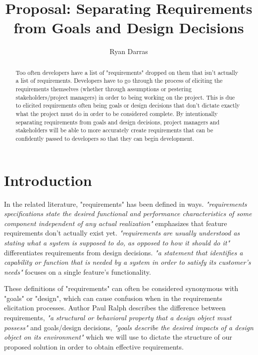 \documentclass[format=acmlarge]{acmart}
\title{Proposal: Separating Requirements from Goals and Design Decisions}
\author{Ryan Darras}
\begin{document}
\begin{abstract}
Too often developers have a list of "requirements" dropped on them that isn't actually a list of requirements. Developers have to go through the process of eliciting the requirements themselves (whether through assumptions or pestering stakeholders/project managers) in order to being working on the project. This is due to elicited requirements often being goals or design decisions that don't dictate exactly what the project must do in order to be considered complete. By intentionally separating requirements from goals and design decisions, project managers and stakeholders will be able to more accurately create requirements that can be confidently passed to developers so that they can begin development.
\end{abstract}

\maketitle

\section{Introduction}
In the related literature, "requirements" has been defined in ways. \emph{"requirements specifications state the desired functional and performance characteristics of some component independent of any actual realization"} \cite{Roman1985} emphasizes that feature requirements don't actually exist yet. \emph{"requirements are usually understood as stating what a system is supposed to do, as opposed to how it should do it"} \cite{Yu1997} differentiates requirements from design decisions. \emph{"a statement that identifies a capability or function that is needed by a system in order to satisfy its customer's needs"} \cite{Bahill2009} focuses on a single feature's functionality.

These definitions of "requirements" can often be considered synonymous with "goals" or "design", which can cause confusion when in the requirements elicitation processes. Author Paul Ralph describes the difference between requirements, \emph{"a structural or behavioral property that a design object must possess"} \cite{Ralph2009} and goals/design decisions, \emph{"goals describe the desired impacts of a design object on its environment"} \cite{Ralph2009} which we will use to dictate the structure of our proposed solution in order to obtain effective requirements. 
\end{document}
